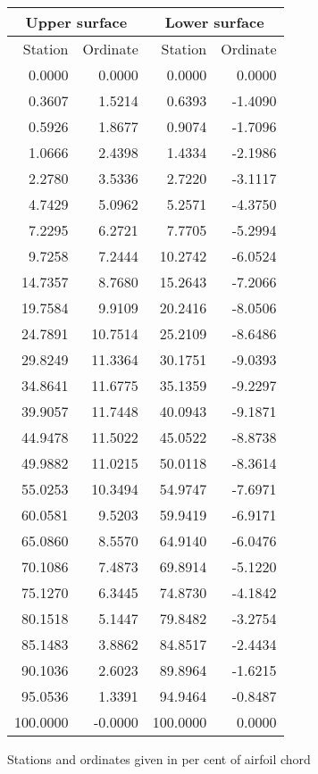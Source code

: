 \documentclass[11pt]{book}
\begin{document}
 \hspace{4mm}
 \begin{tabular}{|r|r|r|r|} \hline 
 \multicolumn{2}{|c|}{Upper surface} & \multicolumn{2}{|c|}{Lower surface} \\
 \hline
 Station & Ordinate & Station & Ordinate \\
 \hline
0.0000 & 0.0000 & 0.0000 & 0.0000 \\
0.3607 & 1.5214 & 0.6393 & -1.4090 \\
0.5926 & 1.8677 & 0.9074 & -1.7096 \\
1.0666 & 2.4398 & 1.4334 & -2.1986 \\
2.2780 & 3.5336 & 2.7220 & -3.1117 \\
4.7429 & 5.0962 & 5.2571 & -4.3750 \\
7.2295 & 6.2721 & 7.7705 & -5.2994 \\
9.7258 & 7.2444 & 10.2742 & -6.0524 \\
14.7357 & 8.7680 & 15.2643 & -7.2066 \\
19.7584 & 9.9109 & 20.2416 & -8.0506 \\
24.7891 & 10.7514 & 25.2109 & -8.6486 \\
29.8249 & 11.3364 & 30.1751 & -9.0393 \\
34.8641 & 11.6775 & 35.1359 & -9.2297 \\
39.9057 & 11.7448 & 40.0943 & -9.1871 \\
44.9478 & 11.5022 & 45.0522 & -8.8738 \\
49.9882 & 11.0215 & 50.0118 & -8.3614 \\
55.0253 & 10.3494 & 54.9747 & -7.6971 \\
60.0581 & 9.5203 & 59.9419 & -6.9171 \\
65.0860 & 8.5570 & 64.9140 & -6.0476 \\
70.1086 & 7.4873 & 69.8914 & -5.1220 \\
75.1270 & 6.3445 & 74.8730 & -4.1842 \\
80.1518 & 5.1447 & 79.8482 & -3.2754 \\
85.1483 & 3.8862 & 84.8517 & -2.4434 \\
90.1036 & 2.6023 & 89.8964 & -1.6215 \\
95.0536 & 1.3391 & 94.9464 & -0.8487 \\
100.0000 & -0.0000 & 100.0000 & 0.0000 \\
 \hline 
 \end{tabular}
 \vspace{8mm}

Stations and ordinates given in per cent of airfoil chord
\end{document}
